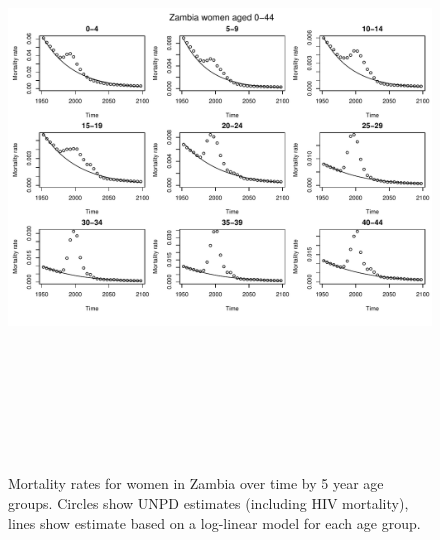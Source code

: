 \documentclass{article}
\begin{document}
\begin{figure}
\includegraphics[width=16cm,height=16cm]{EstimatingRatesFromUNPD-MortalityZamWomen1} 

\caption{Mortality rates for women in Zambia over time by 5 year age groups. Circles show UNPD estimates (including HIV mortality), lines show estimate based on a log-linear model for each age group.}
\label{MortalitySAmen1}
\end{figure}
\end{document}

